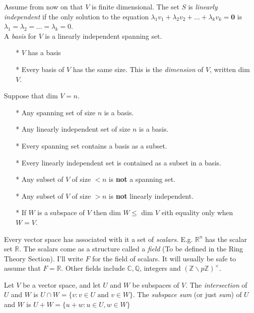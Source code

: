 \documentclass[10pt]{scrartcl}
\begin{document}
Assume from now on that $V$ is finite dimensional. The set $S$ is \emph{linearly independent} if the only solution to the equation $\lambda_1v_1 + \lambda_2v_2 + \dots + \lambda_kv_k = \mathbf{0}$ is $\lambda_1 = \lambda_2 = \dots = \lambda_k = 0.$\\

A \emph{basis} for $V$ is a linearly independent spanning set.

\begin{itemize}
\item[*] $V$ has a basis
\item[*] Every basis of $V$ has the same size. This is the \emph{dimension} of $V$, written dim $V$. 
\end{itemize}

Suppose that dim $V = n$.
\begin{itemize}
\item[*] Any spanning set of size $n$ is a basis. 
\item[*] Any linearly independent set of size $n$ is a basis.
\item[*] Every spanning set contains a basis as a subset.
\item[*] Every linearly independent set is contained as a subset in a basis.
\item[*] Any subset of $V$ of size $< n$ is \textbf{not} a spanning set.
\item[*] Any subset of $V$ of size $>n$ is \textbf{not} linearly independent. 
\item[*] If $W$ is a subspace of $V$ then dim $W \leq $ dim $V$ eith equality only when $W = V$. 
\end{itemize}\vspace*{5pt}

Every vector space has associated with it a set of \emph{scalars}. E.g. $\mathbb{R}^n$ has the scalar set $\mathbb{R}.$ The scalars come as a structure called a \emph{field} (To be defined in the Ring Theory Section). I'll write $F$ for the field of scalars. It will usually be safe to assume that $F = \mathbb{R}$. Other fields include $\mathbb{C}, \mathbb{Q}$, integers and $(\mathbb{Z}\backslash p \mathbb{Z})^{\times}$.

\vspace*{5pt}

\begin{definition} Let $V$ be a vector space, and let $U$ and $W$ be subspaces of $V$. The \emph{intersection} of $U$ and $W$ is $U \cap W = \{v: v \in U \text{ and } v \in W\}$. The \emph{subspace sum} (or just \emph{sum}) of $U$ and $W$ is $U + W = \{u + w: u \in U, w \in W\}$
\end{definition}\vspace*{5pt}
\end{document}
